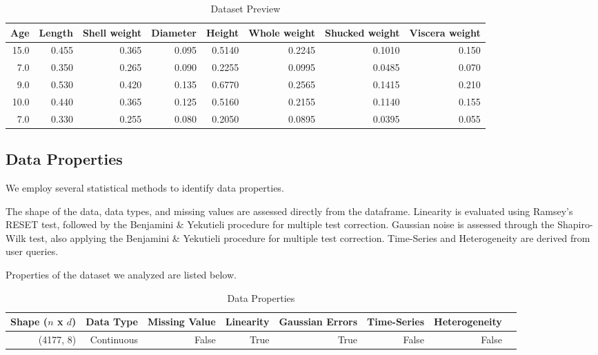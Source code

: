 \documentclass{article}
\begin{document}
\begin{table}[H]
    \centering
    \caption{Dataset Preview}
    \begin{tabular}{rrrrrrrr}
\toprule
 Age &  Length &  Shell weight &  Diameter &  Height &  Whole weight &  Shucked weight &  Viscera weight \\
\midrule
15.0 &   0.455 &         0.365 &     0.095 &  0.5140 &        0.2245 &          0.1010 &           0.150 \\
 7.0 &   0.350 &         0.265 &     0.090 &  0.2255 &        0.0995 &          0.0485 &           0.070 \\
 9.0 &   0.530 &         0.420 &     0.135 &  0.6770 &        0.2565 &          0.1415 &           0.210 \\
10.0 &   0.440 &         0.365 &     0.125 &  0.5160 &        0.2155 &          0.1140 &           0.155 \\
 7.0 &   0.330 &         0.255 &     0.080 &  0.2050 &        0.0895 &          0.0395 &           0.055 \\
\bottomrule
\end{tabular}

\end{table}

\subsection{Data Properties}
We employ several statistical methods to identify data properties.

The shape of the data, data types, and missing values are assessed directly from the dataframe.
Linearity is evaluated using Ramsey’s RESET test, followed by the Benjamini \& Yekutieli procedure for multiple test correction.
Gaussian noise is assessed through the Shapiro-Wilk test, also applying the Benjamini \& Yekutieli procedure for multiple test correction.
Time-Series and Heterogeneity are derived from user queries.

Properties of the dataset we analyzed are listed below.

\begin{table}[H]
    \centering
    \caption{Data Properties}

        \begin{tabular}{rrrrrrrr}
            \toprule
            Shape ($n$ x $d$) & Data Type & Missing Value & Linearity & Gaussian Errors & Time-Series & Heterogeneity \\
            \midrule
            (4177, 8)   & Continuous & False & True & True & False & False \\
            \bottomrule
        \end{tabular}
        
\end{table}
\end{document}
